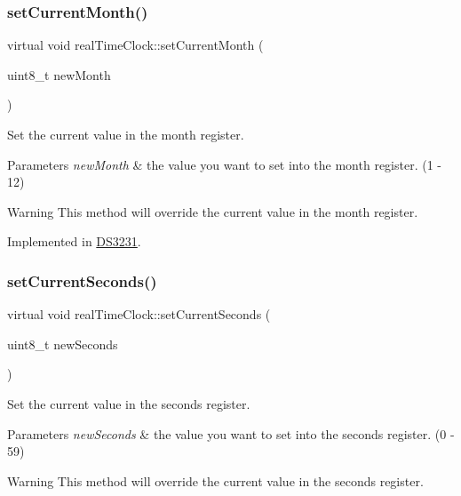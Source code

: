 \subsubsection{\texorpdfstring{set\+Current\+Month()}{setCurrentMonth()}}
{\footnotesize\ttfamily virtual void real\+Time\+Clock\+::set\+Current\+Month (\begin{DoxyParamCaption}\item[{uint8\+\_\+t}]{new\+Month }\end{DoxyParamCaption})\hspace{0.3cm}{\ttfamily [pure virtual]}}



Set the current value in the month register. 


\begin{DoxyParams}{Parameters}
{\em new\+Month} & the value you want to set into the month register. (1 -\/ 12) \\
\hline
\end{DoxyParams}
\begin{DoxyWarning}{Warning}
This method will override the current value in the month register. 
\end{DoxyWarning}


Implemented in \mbox{\hyperlink{class_d_s3231_a122611bf693cdd538178b99b893a7115}{D\+S3231}}.

\mbox{\label{classreal_time_clock_a463a64d4861c75e26a80712e1dd50e6b}} 
\subsubsection{\texorpdfstring{set\+Current\+Seconds()}{setCurrentSeconds()}}
{\footnotesize\ttfamily virtual void real\+Time\+Clock\+::set\+Current\+Seconds (\begin{DoxyParamCaption}\item[{uint8\+\_\+t}]{new\+Seconds }\end{DoxyParamCaption})\hspace{0.3cm}{\ttfamily [pure virtual]}}



Set the current value in the seconds register. 


\begin{DoxyParams}{Parameters}
{\em new\+Seconds} & the value you want to set into the seconds register. (0 -\/ 59) \\
\hline
\end{DoxyParams}
\begin{DoxyWarning}{Warning}
This method will override the current value in the seconds register. 
\end{DoxyWarning}


